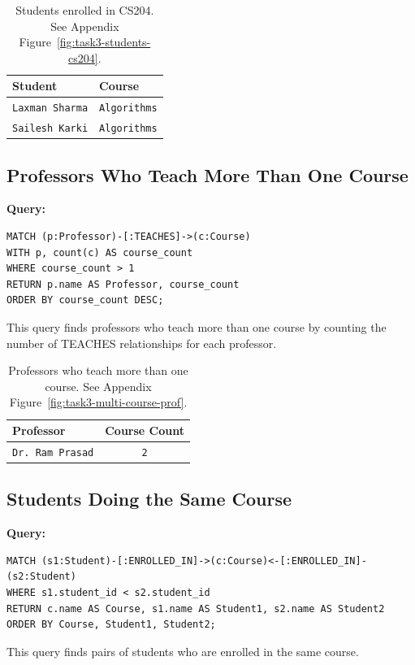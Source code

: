 \begin{table}[H]
  \centering
  \caption{Students enrolled in CS204. See Appendix Figure~\ref{fig:task3-students-cs204}.}
  \begin{tabular}{ll}
    \textbf{Student} & \textbf{Course} \\
    \hline
    \texttt{Laxman Sharma} & \texttt{Algorithms} \\
    \texttt{Sailesh Karki} & \texttt{Algorithms} \\
  \end{tabular}
\end{table}

\subsection{Professors Who Teach More Than One Course}
\textbf{Query:}
\begin{verbatim}
MATCH (p:Professor)-[:TEACHES]->(c:Course)
WITH p, count(c) AS course_count
WHERE course_count > 1
RETURN p.name AS Professor, course_count
ORDER BY course_count DESC;
\end{verbatim}
This query finds professors who teach more than one course by counting the number of TEACHES relationships for each professor.

\begin{table}[H]
  \centering
  \caption{Professors who teach more than one course. See Appendix Figure~\ref{fig:task3-multi-course-prof}.}
  \begin{tabular}{lc}
    \textbf{Professor} & \textbf{Course Count} \\
    \hline
    \texttt{Dr. Ram Prasad} & \texttt{2} \\
  \end{tabular}
\end{table}

\subsection{Students Doing the Same Course}
\textbf{Query:}
\begin{verbatim}
MATCH (s1:Student)-[:ENROLLED_IN]->(c:Course)<-[:ENROLLED_IN]-(s2:Student)
WHERE s1.student_id < s2.student_id
RETURN c.name AS Course, s1.name AS Student1, s2.name AS Student2
ORDER BY Course, Student1, Student2;
\end{verbatim}
This query finds pairs of students who are enrolled in the same course.

